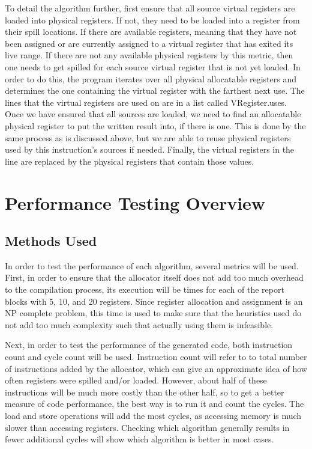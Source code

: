 \documentclass[12pt]{article}
\begin{document}
    To detail the algorithm further, first ensure that all source virtual
    registers are loaded into physical registers. If not, they need to be loaded
    into a register from their spill locations. If there are available
    registers, meaning that they have not been assigned or are currently
    assigned to a virtual register that has exited its live range. If there are
    not any available physical registers by this metric, then one needs to get
    spilled for each source virtual register that is not yet loaded. In order to
    do this, the program iterates over all physical allocatable registers and
    determines the one containing the virtual register with the farthest next
    use. The lines that the virtual registers are used on are in a list called
    VRegister.uses. Once we have ensured that all sources are loaded, we need to
    find an allocatable physical register to put the written result into, if
    there is one. This is done by the same process as is discussed above, but we
    are able to reuse physical registers used by this instruction's sources if
    needed. Finally, the virtual registers in the line are replaced by the
    physical registers that contain those values.



\section{Performance Testing Overview}

    \subsection{Methods Used}
    In order to test the performance of each algorithm, several metrics will be
    used. First, in order to ensure that the allocator itself does not add too
    much overhead to the compilation process, its execution will be times for
    each of the report blocks with 5, 10, and 20 registers. Since register
    allocation and assignment is an NP complete problem, this time is used to
    make sure that the heuristics used do not add too much complexity such that
    actually using them is infeasible.

    Next, in order to test the performance of the generated code, both
    instruction count and cycle count will be used. Instruction count will refer
    to to total number of instructions added by the allocator, which can give an
    approximate idea of how often registers were spilled and/or loaded. However,
    about half of these instructions will be much more costly than the other
    half, so to get a better measure of code performance, the best way is to run
    it and count the cycles. The load and store operations will add the most
    cycles, as accessing memory is much slower than accessing registers.
    Checking which algorithm generally results in fewer additional cycles will
    show which algorithm is better in most cases.
\end{document}
